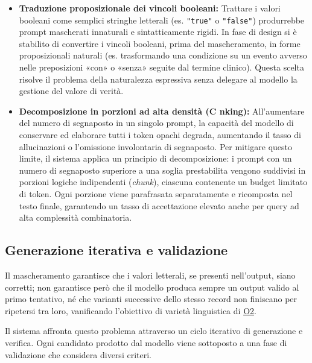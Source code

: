\documentclass[12pt,a4paper,openright,twoside]{book}
\begin{document}
\begin{itemize}
    \item \textbf{Traduzione proposizionale dei vincoli booleani:} Trattare i
          valori booleani come semplici stringhe letterali (es. \texttt{"true"}
          o \texttt{"false"}) produrrebbe prompt mascherati innaturali e
          sintatticamente rigidi. In fase di design si è stabilito di convertire
          i vincoli booleani, prima del mascheramento, in forme proposizionali
          naturali (es. trasformando una condizione su un evento avverso nelle
          preposizioni «con» o «senza» seguite dal termine clinico). Questa
          scelta risolve il problema della naturalezza espressiva senza delegare
          al modello la gestione del valore di verità.

    \item \textbf{Decomposizione in porzioni ad alta densità (C nking):}
          All'aumentare del numero di segnaposto in un singolo prompt, la
          capacità del modello di conservare ed elaborare tutti i token opachi
          degrada, aumentando il tasso di allucinazioni o l'omissione
          involontaria di segnaposto. Per mitigare questo limite, il sistema
          applica un principio di decomposizione: i prompt con un numero di
          segnaposto superiore a una soglia prestabilita vengono suddivisi in
          porzioni logiche indipendenti (\textit{chunk}), ciascuna contenente un
          budget limitato di token. Ogni porzione viene parafrasata
          separatamente e ricomposta nel testo finale, garantendo un tasso di
          accettazione elevato anche per query ad alta complessità combinatoria.
\end{itemize}

\subsection{Generazione iterativa e validazione}

Il mascheramento garantisce che i valori letterali, se presenti nell'output,
siano corretti; non garantisce però che il modello produca sempre un output
valido al primo tentativo, né che varianti successive dello stesso record non
finiscano per ripetersi tra loro, vanificando l'obiettivo di varietà linguistica
di \hyperref[obj:O2]{O2}.

Il sistema affronta questo problema attraverso un ciclo iterativo di generazione
e verifica. Ogni candidato prodotto dal modello viene sottoposto a una fase di
validazione che considera diversi criteri.
\end{document}

